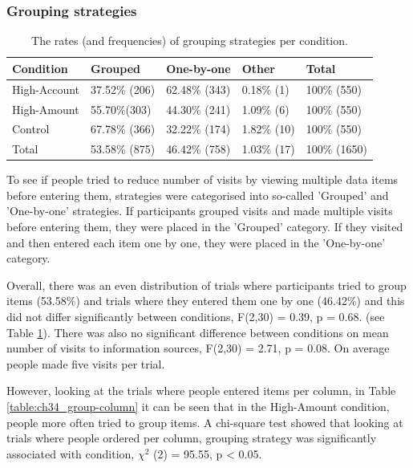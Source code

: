 \subsubsection{Grouping strategies}
\begin{table}[!ht]
\centering
\begin{tabular}{|l|l|l|l|l|}
\hline
Condition    & Grouped       & One-by-one   & Other  & Total      \\ \hline
High-Account & 37.52\% {\footnotesize (206)} & 62.48\% {\footnotesize (343)}  & 0.18\% {\footnotesize(1)}  &  100\% {\footnotesize (550)}  \\ \hline
High-Amount  & 55.70\%{\footnotesize  (303)} & 44.30\% {\footnotesize (241)}  & 1.09\% {\footnotesize(6)}  & 100\% {\footnotesize (550)}  \\ \hline
Control      & 67.78\% {\footnotesize (366)} & 32.22\% {\footnotesize (174)}  & 1.82\% {\footnotesize(10)}  & 100\% {\footnotesize (550)}  \\ \hline
Total        & 53.58\% {\footnotesize (875)} & 46.42\% {\footnotesize (758)} & 1.03\% {\footnotesize(17)} & 100\% {\footnotesize (1650)} \\ \hline
\end{tabular}
\caption{The rates (and frequencies) of grouping strategies per condition.}\label{table:ch34_group-total}
\end{table}

To see if people tried to reduce number of visits by viewing multiple data items before entering them, strategies were categorised into so-called 'Grouped' and 'One-by-one' strategies. If participants grouped visits and made multiple visits before entering them, they were placed in the 'Grouped' category. If they visited and then entered each item one by one, they were placed in the 'One-by-one' category.

Overall, there was an even distribution of trials where participants tried to group items (53.58\%) and trials where they entered them one by one (46.42\%) and this did not differ significantly between conditions, F(2,30) = 0.39, p = 0.68. (see Table \ref{table:ch34_group-total}). There was also no significant difference between conditions on mean number of visits to information sources, F(2,30) = 2.71, p = 0.08. On average people made five visits per trial.

However, looking at the trials where people entered items per column, in Table \ref{table:ch34_group-column} it can be seen that in the High-Amount condition, people more often tried to group items. A chi-square test showed that looking at trials where people ordered per column, grouping strategy was significantly associated with condition, $\chi^2$ (2) = 95.55, p < 0.05. 

